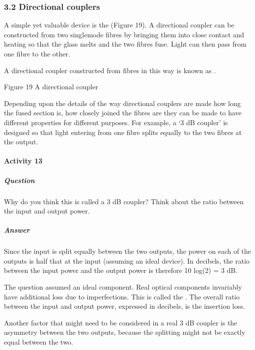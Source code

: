 \documentclass[letterpaper,10pt,english]{sphinxmanual}
\let\sphinxpxdimen\pdfpxdimen\else\newdimen\sphinxpxdimen
\begin{document}
\subsubsection{3.2 Directional couplers}
\label{\detokenize{content/session_00/Part_00_03:3.2-Directional-couplers}}
A simple yet valuable device is the  (Figure 19). A directional coupler can be constructed from two single\sphinxhyphen{}mode fibres by bringing them into close contact and heating so that the glass melts and the two fibres fuse. Light can then pass from one fibre to the other.

A directional coupler constructed from fibres in this way is known as .

\sphinxincludegraphics[width=511\sphinxpxdimen,height=237\sphinxpxdimen]{{t305_019i}.jpg}

Figure 19 A directional coupler

Depending upon the details of the way directional couplers are made \textendash{} how long the fused section is, how closely joined the fibres are \textendash{} they can be made to have different properties for different purposes. For example, a ‘3 dB coupler’ is designed so that light entering from one fibre splits equally to the two fibres at the output.


\paragraph{Activity 13}
\label{\detokenize{content/session_00/Part_00_03:Activity-13}}

\subparagraph{Question}
\label{\detokenize{content/session_00/Part_00_03:Question}}
Why do you think this is called a 3 dB coupler? Think about the ratio between the input and output power.


\subparagraph{Answer}
\label{\detokenize{content/session_00/Part_00_03:Answer}}
Since the input is split equally between the two outputs, the power on each of the outputs is half that at the input (assuming an ideal device). In decibels, the ratio between the input power and the output power is therefore 10 log(2) = 3 dB.

The question assumed an ideal component. Real optical components invariably have additional loss due to imperfections. This is called the . The overall ratio between the input and output power, expressed in decibels, is the insertion loss.

Another factor that might need to be considered in a real 3 dB coupler is the asymmetry between the two outputs, because the splitting might not be exactly equal between the two.
\end{document}
